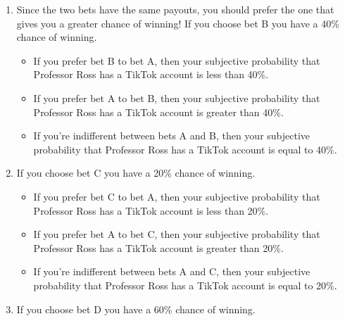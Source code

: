 \documentclass[
]{book}
\providecommand{\tightlist}{%
  \setlength{\itemsep}{0pt}\setlength{\parskip}{0pt}}
\theoremstyle{definition}
\theoremstyle{definition}
\theoremstyle{definition}
\theoremstyle{remark}
\begin{document}
\begin{enumerate}
\def\labelenumi{\arabic{enumi}.}
\tightlist
\item
  Since the two bets have the same payouts, you should prefer the one that gives you a greater chance of winning! If you choose bet B you have a 40\% chance of winning.

  \begin{itemize}
  \tightlist
  \item
    If you prefer bet B to bet A, then your subjective probability that Professor Ross has a TikTok account is less than 40\%.
  \item
    If you prefer bet A to bet B, then your subjective probability that Professor Ross has a TikTok account is greater than 40\%.
  \item
    If you're indifferent between bets A and B, then your subjective probability that Professor Ross has a TikTok account is equal to 40\%.\\
  \end{itemize}
\item
  If you choose bet C you have a 20\% chance of winning.

  \begin{itemize}
  \tightlist
  \item
    If you prefer bet C to bet A, then your subjective probability that Professor Ross has a TikTok account is less than 20\%.
  \item
    If you prefer bet A to bet C, then your subjective probability that Professor Ross has a TikTok account is greater than 20\%.
  \item
    If you're indifferent between bets A and C, then your subjective probability that Professor Ross has a TikTok account is equal to 20\%.\\
  \end{itemize}
\item
  If you choose bet D you have a 60\% chance of winning.


\end{enumerate}
\end{document}
